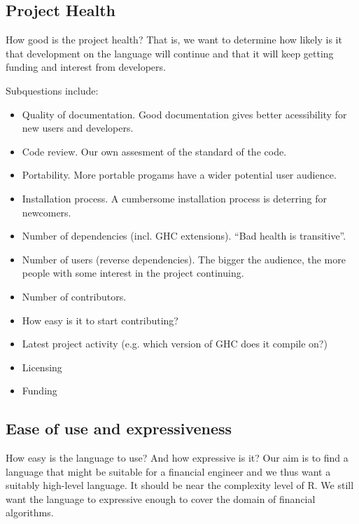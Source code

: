 
\subsection{Project Health}
How good is the project health? That is,
we want to determine how likely is it that development on the language
will continue and that it will keep getting funding and interest from
developers.

Subquestions include:
\begin{itemize}
\item Quality of documentation. Good documentation gives better acessibility for new users and developers.
\item Code review. Our own assesment of the standard of the code.
\item Portability. More portable progams have a wider potential user audience.
\item Installation process. A cumbersome installation process is deterring for newcomers.
\item Number of dependencies (incl. GHC extensions). ``Bad health is transitive''.
\item Number of users (reverse dependencies). The bigger the audience, the more people with some interest in the project continuing.
\item Number of contributors.
\item How easy is it to start contributing?
\item Latest project activity (e.g. which version of GHC does it compile on?)
\item Licensing
\item Funding
\end{itemize}


\subsection{Ease of use and expressiveness}

How easy is the language to use? And how expressive is it? Our
aim is to find a language that might be suitable for a financial
engineer and we thus want a suitably high-level language. It should
be near the complexity level of R. We still want the language to
expressive enough to cover the domain of financial algorithms.

